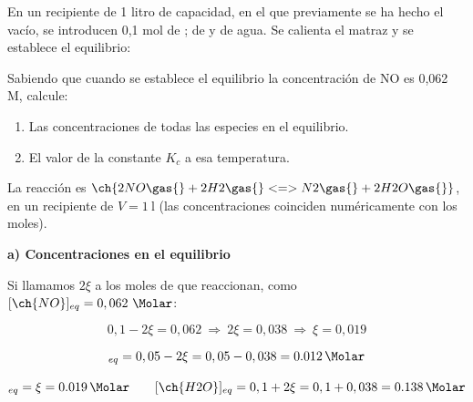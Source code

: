 \begin{exerciseEVAU}
    En un recipiente de 1 litro de capacidad, en el que previamente se ha hecho el vacío, se introducen 0,1 mol de ;  de  y  de agua.
    Se calienta el matraz y se establece el equilibrio:
    \begin{center}
    \end{center}
    Sabiendo que cuando se establece el equilibrio la concentración de NO es 0,062 M, calcule:
    \begin{enumerate}[label=\letraminuscula]
        \item Las concentraciones de todas las especies en el equilibrio.
        \item El valor de la constante \(K_c\) a esa temperatura.
    \end{enumerate}


    \begin{solu}

        La reacción es \(\ch{2 NO \gas{} + 2 H2 \gas{} <=> N2 \gas{} + 2 H2O \gas{}}\), en un recipiente de \(V = \SI{1}{\litre}\) (las concentraciones coinciden numéricamente con los moles).

        \textbf{a) Concentraciones en el equilibrio}

        Si llamamos \(2\xi\) a los moles de  que reaccionan, como \([\ch{NO}]_{eq} = 0,062\ \si{\Molar}\):

        \begin{equation*}
            0,1 - 2\xi = 0,062 \ \Rightarrow \ 2\xi = 0,038 \ \Rightarrow \ \xi = 0,019
        \end{equation*}

        \begin{equation*}
            [\ch{H2}]_{eq} = 0,05 - 2\xi = 0,05 - 0,038 = \SI{0.012}{\Molar}
        \end{equation*}

        \begin{equation*}
            [\ch{N2}]_{eq} = \xi = \SI{0.019}{\Molar} \qquad [\ch{H2O}]_{eq} = 0,1 + 2\xi = 0,1 + 0,038 = \SI{0.138}{\Molar}
        \end{equation*}


\end{solu}
\end{exerciseEVAU}
